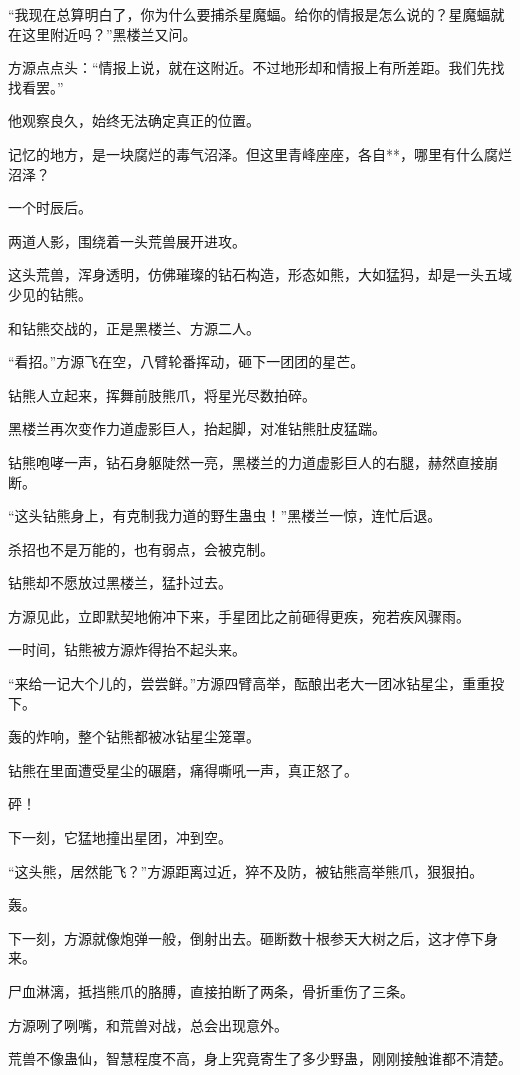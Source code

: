 \begin{this_body}
“我现在总算明白了，你为什么要捕杀星魔蝠。给你的情报是怎么说的？星魔蝠就在这里附近吗？”黑楼兰又问。

方源点点头：“情报上说，就在这附近。不过地形却和情报上有所差距。我们先找找看罢。”

他观察良久，始终无法确定真正的位置。

记忆的地方，是一块腐烂的毒气沼泽。但这里青峰座座，各自**，哪里有什么腐烂沼泽？

一个时辰后。

两道人影，围绕着一头荒兽展开进攻。

这头荒兽，浑身透明，仿佛璀璨的钻石构造，形态如熊，大如猛犸，却是一头五域少见的钻熊。

和钻熊交战的，正是黑楼兰、方源二人。

“看招。”方源飞在空，八臂轮番挥动，砸下一团团的星芒。

钻熊人立起来，挥舞前肢熊爪，将星光尽数拍碎。

黑楼兰再次变作力道虚影巨人，抬起脚，对准钻熊肚皮猛踹。

钻熊咆哮一声，钻石身躯陡然一亮，黑楼兰的力道虚影巨人的右腿，赫然直接崩断。

“这头钻熊身上，有克制我力道的野生蛊虫！”黑楼兰一惊，连忙后退。

杀招也不是万能的，也有弱点，会被克制。

钻熊却不愿放过黑楼兰，猛扑过去。

方源见此，立即默契地俯冲下来，手星团比之前砸得更疾，宛若疾风骤雨。

一时间，钻熊被方源炸得抬不起头来。

“来给一记大个儿的，尝尝鲜。”方源四臂高举，酝酿出老大一团冰钻星尘，重重投下。

轰的炸响，整个钻熊都被冰钻星尘笼罩。

钻熊在里面遭受星尘的碾磨，痛得嘶吼一声，真正怒了。

砰！

下一刻，它猛地撞出星团，冲到空。

“这头熊，居然能飞？”方源距离过近，猝不及防，被钻熊高举熊爪，狠狠拍。

轰。

下一刻，方源就像炮弹一般，倒射出去。砸断数十根参天大树之后，这才停下身来。

尸血淋漓，抵挡熊爪的胳膊，直接拍断了两条，骨折重伤了三条。

方源咧了咧嘴，和荒兽对战，总会出现意外。

荒兽不像蛊仙，智慧程度不高，身上究竟寄生了多少野蛊，刚刚接触谁都不清楚。


\end{this_body}
